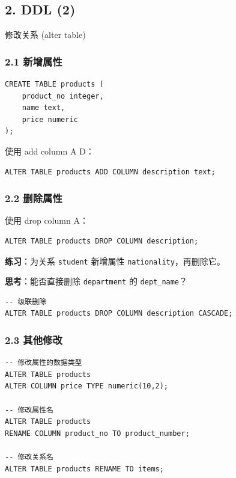\documentclass[aspectratio=169, 14pt]{beamer}
\begin{document}
\begin{frame}
	\section{\textcolor{darkmidnightblue}{2. DDL (2)}}
	修改关系 (\alert{alter table})
\end{frame}

\begin{frame}[fragile]
	\frametitle{2.1 新增属性}

	\begin{verbatim}
CREATE TABLE products (
    product_no integer,
    name text,
    price numeric
);
    \end{verbatim}

	使用 \alert{add column A D}：

	\begin{verbatim}
ALTER TABLE products ADD COLUMN description text;    
\end{verbatim}

\end{frame}

\begin{frame}[fragile]
	\frametitle{2.2 删除属性}
	使用 \alert{drop column A}：
	\begin{verbatim}
ALTER TABLE products DROP COLUMN description; 
    \end{verbatim}
	{\large {}}  \textbf{练习}：为关系 \texttt{student} 新增属性 \texttt{nationality}，再删除它。

	\pause
	{\large {}}  \textbf{思考}：能否直接删除 \texttt{department} 的 \texttt{dept\_name}？

	\pause

	\begin{verbatim}
-- 级联删除
ALTER TABLE products DROP COLUMN description CASCADE;
\end{verbatim}

\end{frame}

\begin{frame}[fragile]
	\frametitle{2.3 其他修改}
	\begin{verbatim}
-- 修改属性的数据类型
ALTER TABLE products 
ALTER COLUMN price TYPE numeric(10,2);

-- 修改属性名
ALTER TABLE products 
RENAME COLUMN product_no TO product_number;

-- 修改关系名
ALTER TABLE products RENAME TO items;
    \end{verbatim}

\end{frame}
\end{document}

